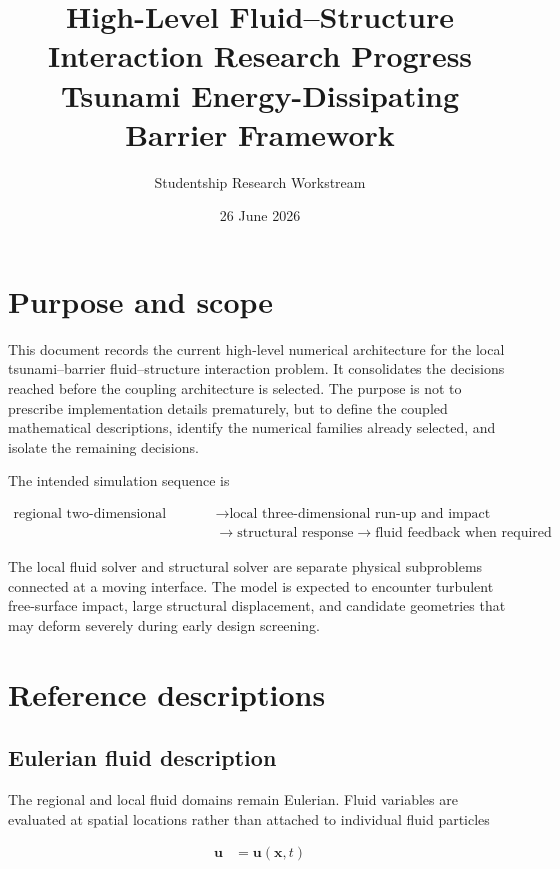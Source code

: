 \documentclass[11pt,a4paper]{article}
\title{High-Level Fluid--Structure Interaction Research Progress\\
\large Tsunami Energy-Dissipating Barrier Framework}
\author{Studentship Research Workstream}
\date{26 June 2026}
\begin{document}
\maketitle
\tableofcontents
\clearpage

\section{Purpose and scope}
\label{sec:purpose}

This document records the current high-level numerical architecture for the local tsunami--barrier fluid--structure interaction problem. It consolidates the decisions reached before the coupling architecture is selected. The purpose is not to prescribe implementation details prematurely, but to define the coupled mathematical descriptions, identify the numerical families already selected, and isolate the remaining decisions.

The intended simulation sequence is

\begin{align}
\text{regional two-dimensional propagation}
&\longrightarrow
\text{local three-dimensional run-up and impact}
\nonumber\\
&\longrightarrow
\text{structural response}
\longrightarrow
\text{fluid feedback when required}
\label{eq:simulation-sequence}
\end{align}

The local fluid solver and structural solver are separate physical subproblems connected at a moving interface. The model is expected to encounter turbulent free-surface impact, large structural displacement, and candidate geometries that may deform severely during early design screening.

\section{Reference descriptions}
\label{sec:reference-descriptions}

\subsection{Eulerian fluid description}
\label{subsec:eulerian-fluid}

The regional and local fluid domains remain Eulerian. Fluid variables are evaluated at spatial locations rather than attached to individual fluid particles

\begin{align}
\bm{u} &= \bm{u}(\bm{x},t)
\label{eq:eulerian-velocity}
\end{align}
\end{document}
